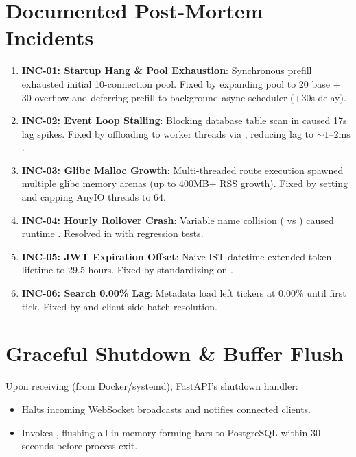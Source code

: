 \section{Documented Post-Mortem Incidents}
\begin{enumerate}[leftmargin=6mm,itemsep=2mm]
    \item \textbf{INC-01: Startup Hang \& Pool Exhaustion}: Synchronous prefill exhausted initial 10-connection pool. Fixed by expanding pool to 20 base + 30 overflow and deferring prefill to background async scheduler (+30s delay).
    \item \textbf{INC-02: Event Loop Stalling}: Blocking database table scan in  caused 17s lag spikes. Fixed by offloading to worker threads via , reducing lag to $\sim 1$--$2\text{ms}$.
    \item \textbf{INC-03: Glibc Malloc Growth}: Multi-threaded route execution spawned multiple glibc memory arenas (up to 400MB+ RSS growth). Fixed by setting  and capping AnyIO threads to 64.
    \item \textbf{INC-04: Hourly Rollover Crash}: Variable name collision ( vs ) caused runtime . Resolved in  with regression tests.
    \item \textbf{INC-05: JWT Expiration Offset}: Naive IST datetime extended token lifetime to 29.5 hours. Fixed by standardizing on .
    \item \textbf{INC-06: Search 0.00\% Lag}: Metadata load left tickers at 0.00\% until first tick. Fixed by  and client-side batch resolution.
\end{enumerate}

\section{Graceful Shutdown \& Buffer Flush}
Upon receiving  (from Docker/systemd), FastAPI's shutdown handler:
\begin{itemize}[leftmargin=6mm,itemsep=1.5mm]
    \item Halts incoming WebSocket broadcasts and notifies connected clients.
    \item Invokes , flushing all in-memory forming bars to PostgreSQL within 30 seconds before process exit.
\end{itemize}
